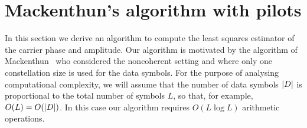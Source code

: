 \documentclass[journal]{IEEEtran}
\begin{document}

\section{Mackenthun's algorithm with pilots}\label{sec:least-squar-estim}

In this section we derive an algorithm to compute the least squares estimator of the carrier phase and amplitude.  Our algorithm is motivated by the algorithm of Mackenthun~\cite{Mackenthun1994} who considered the noncoherent setting and where only one constellation size is used for the data symbols.  For the purpose of analysing computational complexity, we will assume that the number of data symbols ${\left\vert D \right\vert}$ is proportional to the total number of symbols $L$, so that, for example, $O(L) = O({\left\vert D \right\vert})$.  In this case our algorithm requires $O(L \log L)$ arithmetic operations.


\end{document}
